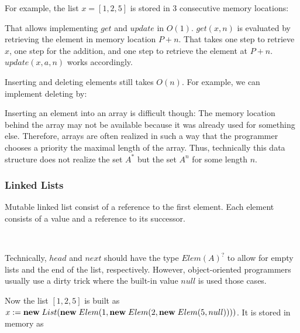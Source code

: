 For example, the list $x=[1,2,5]$ is stored in $3$ consecutive memory locations:
\begin{amemory}
\alocations
{}
\end{amemory}

That allows implementing $get$ and $update$ in $O(1)$.
$get(x,n)$ is evaluated by retrieving the element in memory location $P+n$.
That takes one step to retrieve $x$, one step for the addition, and one step to retrieve the element at $P+n$.
$update(x,a,n)$ works accordingly.

Inserting and deleting elements still takes $O(n)$.
For example, we can implement deleting by:
\begin{acode}
\end{acode}

Inserting an element into an array is difficult though: The memory location behind the array may not be available because it was already used for something else.
Therefore, arrays are often realized in such a way that the programmer chooses a priority the maximal length of the array.
Thus, technically this data structure does not realize the set $A^*$ but the set $A^n$ for some length $n$.

\subsubsection{Linked Lists}

Mutable linked list consist of a reference to the first element.
Each element consists of a value and a reference to its successor.
\begin{acode}
\\
\end{acode}

Technically, $head$ and $next$ should have the type $Elem(A)^?$ to allow for empty lists and the end of the list, respectively.
However, object-oriented programmers usually use a dirty trick where the built-in value $null$ is used those cases.

Now the list $[1,2,5]$ is built as $x:=\textbf{new}\; List(\textbf{new}\; Elem(1, \textbf{new}\; Elem(2, \textbf{new}\; Elem(5, null))))$.
It is stored in memory as
\begin{amemory}
\alocations
{}
\hline
{}
\hline
{}
\hline
{}
\end{amemory}


